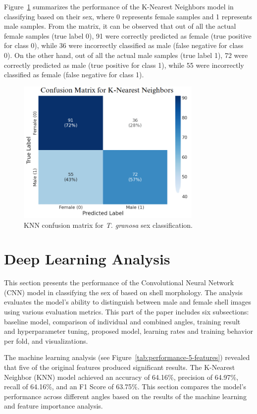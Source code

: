 Figure~\ref{fig:cm_ml} summarizes the performance of the K-Nearest Neighbors model in classifying \Tgranosa based on their sex, where 0 represents female samples and 1 represents male samples. From the matrix, it can be observed that out of all the actual female samples (true label 0), 91 were correctly predicted as female (true positive for class 0), while 36 were incorrectly classified as male (false negative for class 0). On the other hand, out of all the actual male samples (true label 1), 72 were correctly predicted as male (true positive for class 1), while 55 were incorrectly classified as female (false negative for class 1).

\begin{figure}[!htbp]
	\centering
	\includegraphics[width=0.8\textwidth]{figures/confusion_matrix_ml.png}
	\caption{KNN confusion matrix for \textit{T. granosa} sex classification.}
	\label{fig:cm_ml}
\end{figure}

\newpage
\section{Deep Learning Analysis}
This section presents the performance of the Convolutional Neural Network (CNN) model in classifying the sex of \Tgranosa based on shell morphology. The analysis evaluates the model's ability to distinguish between male and female shell images using various evaluation metrics. This part of the paper includes six subsections: baseline model, comparison of individual and combined angles, training result and hyperparameter tuning, proposed model, learning rates and training behavior per fold, and visualizations.

The machine learning analysis (see Figure~\ref{tab:performance-5-features}) revealed that five of the original features produced significant results. The K-Nearest Neighbor (KNN) model achieved an accuracy of 64.16\%, precision of 64.97\%, recall of 64.16\%, and an F1 Score of 63.75\%. This section compares the model's performance across different angles based on the results of the machine learning and feature importance analysis.

